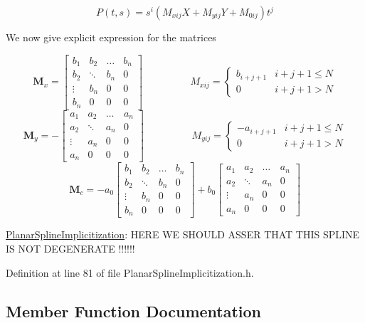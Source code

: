 \[ P(t,s)=s^i\left(M_{xij}X+M_{yij}Y+M_{0ij}\right)t^j \] \begin{DoxyVerb}    We now give explicit expression for the matrices
\end{DoxyVerb}
 \[ \mathbf{M}_x= \left[\begin{array}{llll} b_1&b_2&\ldots&b_n\\ b_2&\ddots&b_n&0\\ \vdots&b_n&0&0\\ b_n&0&0&0 \end{array}\right] \hspace{2cm} M_{xij}= \left\{\begin{array}{ll} b_{i+j+1}& i+j+1\le N\\ 0& i+j+1 > N \end{array}\right. \] \[ \mathbf{M}_y=- \left[\begin{array}{llll} a_1&a_2&\ldots&a_n\\ a_2&\ddots&a_n&0\\ \vdots&a_n&0&0\\ a_n&0&0&0 \end{array}\right] \hspace{2cm} M_{yij}= \left\{\begin{array}{ll} -a_{i+j+1}& i+j+1\le N\\ 0& i+j+1 > N \end{array}\right. \] \[ \mathbf{M}_c=-a_0 \left[\begin{array}{llll} b_1&b_2&\ldots&b_n\\ b_2&\ddots&b_n&0\\ \vdots&b_n&0&0\\ b_n&0&0&0 \end{array}\right] +b_0 \left[\begin{array}{llll} a_1&a_2&\ldots&a_n\\ a_2&\ddots&a_n&0\\ \vdots&a_n&0&0\\ a_n&0&0&0 \end{array}\right] \]

\hyperlink{classmodel_1_1_planar_spline_implicitization}{Planar\+Spline\+Implicitization}\+: H\+E\+R\+E W\+E S\+H\+O\+U\+L\+D A\+S\+S\+E\+R T\+H\+A\+T T\+H\+I\+S S\+P\+L\+I\+N\+E I\+S N\+O\+T D\+E\+G\+E\+N\+E\+R\+A\+T\+E !!!!!! 

Definition at line 81 of file Planar\+Spline\+Implicitization.\+h.



\subsection{Member Function Documentation}
\hypertarget{classmodel_1_1_planar_spline_implicitization_ad23cca21c98b598dc94bae17262c7908}{}
